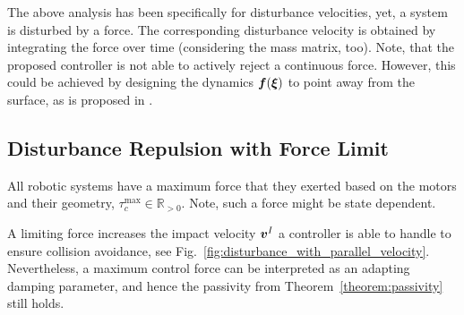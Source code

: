The above analysis has been specifically for disturbance velocities, yet, a system is disturbed by a force. The corresponding disturbance velocity is obtained by integrating the force over time (considering the mass matrix, too). 
Note, that the proposed controller is not able to actively reject a continuous force. 
However, this could be achieved by designing the dynamics $\boldsymbol{f}(\boldsymbol{\xi})$ to point away from the surface, as is proposed in \cite{huber2023avoidance}.

\subsection{Disturbance Repulsion with Force Limit}
All robotic systems have a maximum force that they  exerted based on the motors and their geometry, $\tau_c^{\mathrm{max}} \in \mathbb{R}_{>0}$. Note, such a force might be state dependent.

A limiting force increases the impact velocity $\boldsymbol{v}^I$ a controller is able to handle to ensure collision avoidance, see Fig.~\ref{fig:disturbance_with_parallel_velocity}. Nevertheless, a maximum control force can be interpreted as an adapting damping parameter, and hence the passivity from Theorem~\ref{theorem:passivity} still holds.




